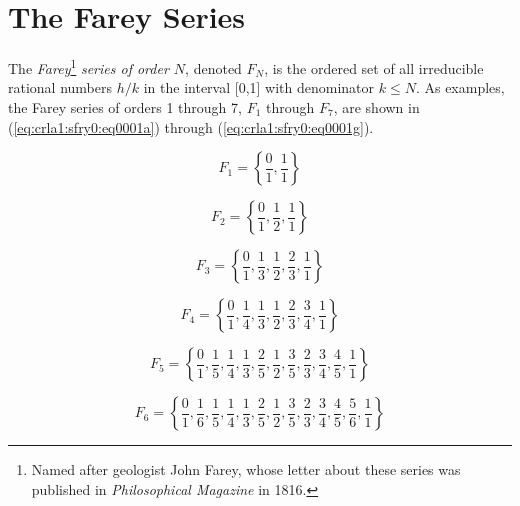 \section{The Farey Series}
\label{crla1:sfry0}

The \emph{Farey}\footnote{Named after geologist John
Farey, whose letter about these series was published in
\emph{Philosophical Magazine} in 1816.} \emph{series of order
$N$}, denoted $F_{N}$, is the ordered
set of all irreducible rational numbers $h/k$ in the interval [0,1] with
denominator $k\leq N$.  As examples, the Farey series of orders 1 through
7, $F_1$ through $F_7$, are shown in (\ref{eq:crla1:sfry0:eq0001a})
through (\ref{eq:crla1:sfry0:eq0001g}).

\begin{equation}
\label{eq:crla1:sfry0:eq0001a}
F_1  = \left\{ {\frac{0}{1},\frac{1}{1}} \right\}
\end{equation}

\begin{equation}
\label{eq:crla1:sfry0:eq0001b}
F_2  = \left\{ {\frac{0}{1},\frac{1}{2},\frac{1}{1}} \right\}
\end{equation}

\begin{equation}
\label{eq:crla1:sfry0:eq0001c}
F_3  = \left\{ {\frac{0}{1},\frac{1}{3},\frac{1}{2},
                \frac{2}{3},\frac{1}{1}} \right\}
\end{equation}

\begin{equation}
\label{eq:crla1:sfry0:eq0001d}
F_4  = \left\{ {\frac{0}{1},\frac{1}{4},
                \frac{1}{3},\frac{1}{2},
                \frac{2}{3},\frac{3}{4},
                \frac{1}{1}} \right\}
\end{equation}

\begin{equation}
\label{eq:crla1:sfry0:eq0001e}
F_5  = \left\{ {\frac{0}{1},\frac{1}{5},\frac{1}{4},
                \frac{1}{3},\frac{2}{5},\frac{1}{2},
                \frac{3}{5},\frac{2}{3},\frac{3}{4},
                \frac{4}{5},\frac{1}{1}} \right\}
\end{equation}

\begin{equation}
\label{eq:crla1:sfry0:eq0001f}
F_6  = \left\{ {\frac{0}{1},\frac{1}{6},\frac{1}{5},
                \frac{1}{4},
                \frac{1}{3},\frac{2}{5},\frac{1}{2},
                \frac{3}{5},\frac{2}{3},
                \frac{3}{4},
                \frac{4}{5},
                \frac{5}{6},\frac{1}{1}} \right\}
\end{equation}


